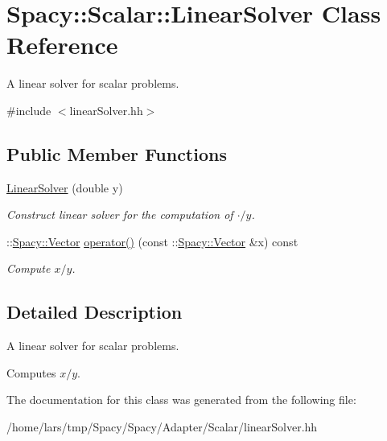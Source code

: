 \hypertarget{classSpacy_1_1Scalar_1_1LinearSolver}{}\section{Spacy\+:\+:Scalar\+:\+:Linear\+Solver Class Reference}
\label{classSpacy_1_1Scalar_1_1LinearSolver}


A linear solver for scalar problems.  




{\ttfamily \#include $<$linear\+Solver.\+hh$>$}

\subsection*{Public Member Functions}
\begin{DoxyCompactItemize}
\item 
\hyperlink{classSpacy_1_1Scalar_1_1LinearSolver_a926ba08309237607f1f8233a62c050cd}{Linear\+Solver} (double y)\hypertarget{classSpacy_1_1Scalar_1_1LinearSolver_a926ba08309237607f1f8233a62c050cd}{}\label{classSpacy_1_1Scalar_1_1LinearSolver_a926ba08309237607f1f8233a62c050cd}

\begin{DoxyCompactList}\small\item\em Construct linear solver for the computation of $\cdot/y$. \end{DoxyCompactList}\item 
\+::\hyperlink{classSpacy_1_1Vector}{Spacy\+::\+Vector} \hyperlink{classSpacy_1_1Scalar_1_1LinearSolver_a2acd32e9eede5a5e868c85a8f62b757b}{operator()} (const \+::\hyperlink{classSpacy_1_1Vector}{Spacy\+::\+Vector} \&x) const \hypertarget{classSpacy_1_1Scalar_1_1LinearSolver_a2acd32e9eede5a5e868c85a8f62b757b}{}\label{classSpacy_1_1Scalar_1_1LinearSolver_a2acd32e9eede5a5e868c85a8f62b757b}

\begin{DoxyCompactList}\small\item\em Compute $x/y$. \end{DoxyCompactList}\end{DoxyCompactItemize}


\subsection{Detailed Description}
A linear solver for scalar problems. 

Computes $x/y$. 

The documentation for this class was generated from the following file\+:\begin{DoxyCompactItemize}
\item 
/home/lars/tmp/\+Spacy/\+Spacy/\+Adapter/\+Scalar/linear\+Solver.\+hh\end{DoxyCompactItemize}
